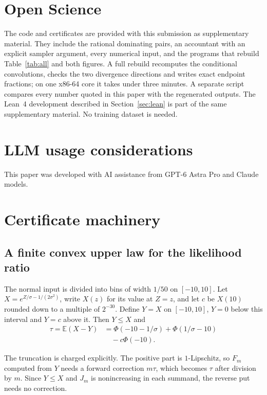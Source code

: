 \documentclass[conference]{IEEEtran}
\newcommand{\E}{\mathbb E}
\begin{document}
\section*{Open Science}
The code and certificates are provided with this submission as supplementary material. They include the rational dominating pairs, an accountant with an explicit sampler argument, every numerical input, and the programs that rebuild Table~\ref{tab:all} and both figures. A full rebuild recomputes the conditional convolutions, checks the two divergence directions and writes exact endpoint fractions; on one x86-64 core it takes under three minutes. A separate script compares every number quoted in this paper with the regenerated outputs. The Lean~4 development described in Section~\ref{sec:lean} is part of the same supplementary material. No training dataset is needed.

\section*{LLM usage considerations}
This paper was developed with AI assistance from GPT-6 Astra Pro and Claude models.




\appendices
\section{Certificate machinery}\label{app:certificate}
\subsection{A finite convex upper law for the likelihood ratio}
The normal input is divided into bins of width $1/50$ on $[-10,10]$. Let $X=e^{Z/\sigma-1/(2\sigma^2)}$, write $X(z)$ for its value at $Z=z$, and let $c$ be $X(10)$ rounded down to a multiple of $2^{-30}$. Define $Y=X$ on $[-10,10]$, $Y=0$ below this interval and $Y=c$ above it. Then $Y\le X$ and
\begin{align}\label{eq:tau}
 \tau=\E(X-Y)
 &=\Phi(-10-1/\sigma)+\Phi(1/\sigma-10)\nonumber\\
 &\quad-c\Phi(-10).
\end{align}

The truncation is charged explicitly. The positive part is $1$-Lipschitz, so $F_m$ computed from $Y$ needs a forward correction $m\tau$, which becomes $\tau$ after division by $m$. Since $Y\le X$ and $J_m$ is nonincreasing in each summand, the reverse put needs no correction.
\end{document}
